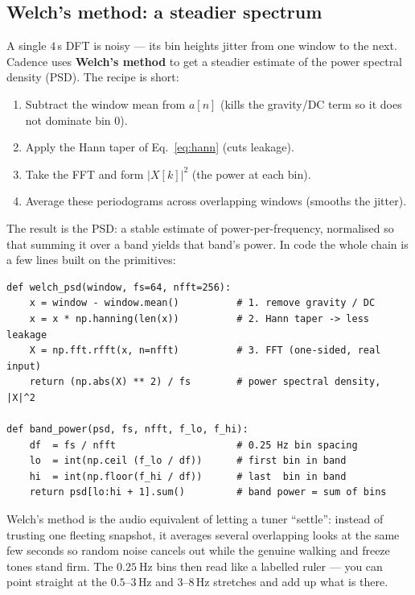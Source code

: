 \subsection{Welch's method: a steadier spectrum}

A single \(4\,\)s DFT is noisy --- its bin heights jitter from one window to the next.
Cadence uses \textbf{Welch's method} to get a steadier estimate of the power spectral
density (PSD). The recipe is short:
\begin{enumerate}
\item Subtract the window mean from \(a[n]\) (kills the gravity/DC term so it does not
      dominate bin \(0\)).
\item Apply the Hann taper of Eq.~\eqref{eq:hann} (cuts leakage).
\item Take the FFT and form \(|X[k]|^2\) (the power at each bin).
\item Average these periodograms across overlapping windows (smooths the jitter).
\end{enumerate}
The result is the PSD: a stable estimate of power-per-frequency, normalised so that
summing it over a band yields that band's power. In code the whole chain is a few
lines built on the  primitives:

\begin{lstlisting}[style=py,caption={The Welch PSD chain, then a band-power slice (from \code{fog.dsp}).}]
def welch_psd(window, fs=64, nfft=256):
    x = window - window.mean()          # 1. remove gravity / DC
    x = x * np.hanning(len(x))          # 2. Hann taper -> less leakage
    X = np.fft.rfft(x, n=nfft)          # 3. FFT (one-sided, real input)
    return (np.abs(X) ** 2) / fs        # power spectral density, |X|^2

def band_power(psd, fs, nfft, f_lo, f_hi):
    df  = fs / nfft                     # 0.25 Hz bin spacing
    lo  = int(np.ceil (f_lo / df))      # first bin in band
    hi  = int(np.floor(f_hi / df))      # last  bin in band
    return psd[lo:hi + 1].sum()         # band power = sum of bins
\end{lstlisting}

\begin{intuition}
Welch's method is the audio equivalent of letting a tuner ``settle'': instead of
trusting one fleeting snapshot, it averages several overlapping looks at the same few
seconds so random noise cancels out while the genuine walking and freeze tones stand
firm. The \(\SI{0.25}{\hertz}\) bins then read like a labelled ruler --- you can point
straight at the \(0.5\text{--}3\,\)Hz and \(3\text{--}8\,\)Hz stretches and add up
what is there.
\end{intuition}

